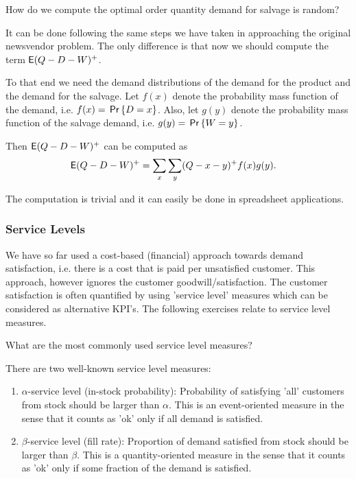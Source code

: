 \begin{question}
How do we compute the optimal order quantity demand for salvage is random?
\end{question}

\begin{solution}
It can be done following the same steps we have taken in approaching the original newsvendor problem. The only difference is that now we should compute the term $\mathsf{E} (Q-D-W)^+$. 

To that end we need the demand distributions of the demand for the product and the demand for the salvage. Let $f(x)$ denote the probability mass function of the demand, i.e. $f(x)=\,\mathsf{Pr}\left\{D=x\right\}$. Also, let $g(y)$ denote the probability mass function of the salvage demand, i.e. $g(y)=\,\mathsf{Pr}\left\{W=y\right\}$. 

Then $\mathsf{E} (Q-D-W)^+$ can be computed as
\begin{align*}
\mathsf{E} (Q-D-W)^+ & = \sum_x \sum_y (Q-x-y)^+ f(x) g(y).
\end{align*}
\end{solution}
The computation is trivial and it can easily be done in spreadsheet applications.


\subsubsection{Service Levels}

We have so far used a cost-based (financial) approach towards demand satisfaction, i.e. there is a cost that is paid per unsatisfied customer. This approach, however ignores the customer goodwill/satisfaction. The customer satisfaction is often quantified by using 'service level' measures which can be considered as alternative KPI's. The following exercises relate to service level measures. 

\begin{question}
What are the most commonly used service level measures?
\end{question}

\begin{solution}
There are two well-known service level measures:
\begin{enumerate}
\item $\alpha$-service level (in-stock probability): Probability of satisfying 'all' customers from stock should be larger than $\alpha$. This is an event-oriented measure in the sense that it counts as 'ok' only if all demand is satisfied. 
\item $\beta$-service level (fill rate): Proportion of demand satisfied from stock should be larger than $\beta$. This is a quantity-oriented measure in the sense that it counts as 'ok' only if some fraction of the demand is satisfied. 
\end{enumerate}
\end{solution}

